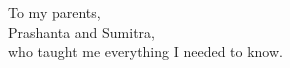 \documentclass[final,numrefs,sort&compress]{nddiss2e}
\begin{document}
\renewcommand{\dedicationname}{Dedicated to}

\begin{dedication}
  To my parents,\\ Prashanta and Sumitra,\\ who taught me everything I needed to know.
\end{dedication}

\tableofcontents
\listoffigures
\listoftables


\end{document}
